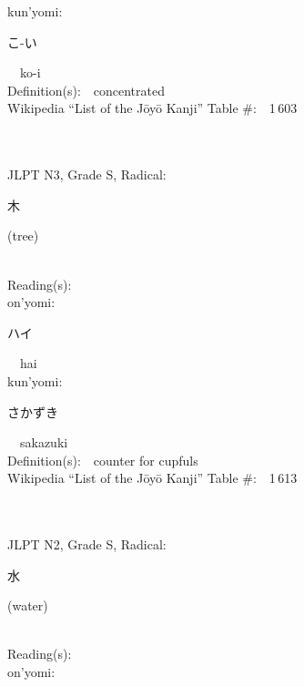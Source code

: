 \begin{multicols}{2}
{\hspace*{1em}}kun'yomi:\ \ \\
{\hspace*{2em}}{\begin{CJK}{UTF8}{min} こ-い \end{CJK}}\ \ ko-i\ \ \\
Definition(s):\ \ concentrated \\
Wikipedia ``List of the J\=oy\=o Kanji'' Table \#:\ \ 1\,603 \\
\ \ \\
{\fontsize{34pt}{40pt}  }\ \ \\  %
{JLPT N3, Grade S, Radical:\ \ {\begin{CJK}{UTF8}{min} 木 \end{CJK}} (tree) } \\
Reading(s):\ \ \\
{\hspace*{1em}}on'yomi:\ \ \\
{\hspace*{2em}}{\begin{CJK}{UTF8}{min} ハイ \end{CJK}}\ \ hai\ \ \\
{\hspace*{1em}}kun'yomi:\ \ \\
{\hspace*{2em}}{\begin{CJK}{UTF8}{min} さかずき \end{CJK}}\ \ sakazuki\ \ \\
Definition(s):\ \ counter for cupfuls \\
Wikipedia ``List of the J\=oy\=o Kanji'' Table \#:\ \ 1\,613 \\
\ \ \\
{\fontsize{34pt}{40pt}  }\ \ \\  %
{JLPT N2, Grade S, Radical:\ \ {\begin{CJK}{UTF8}{min} 水 \end{CJK}} (water) } \\
Reading(s):\ \ \\
{\hspace*{1em}}on'yomi:\ \ \\

\end{multicols}
